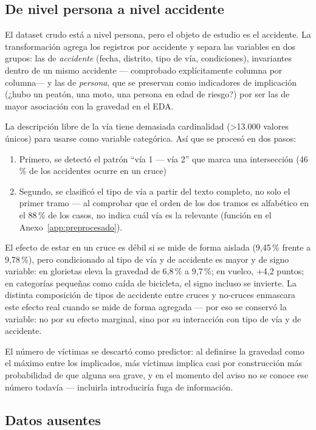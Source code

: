 \documentclass[11pt,a4paper]{article}
\begin{document}
\subsection{De nivel persona a nivel accidente}

El dataset crudo está a nivel persona, pero el objeto de estudio es el accidente. La transformación agrega los registros por accidente y separa las variables en dos grupos: las de \emph{accidente} (fecha, distrito, tipo de vía, condiciones), invariantes dentro de un mismo accidente --- comprobado explícitamente columna por columna--- y las de \emph{persona}, que se preservan como indicadores de implicación (¿hubo un peatón, una moto, una persona en edad de riesgo?) por ser las de mayor asociación con la gravedad en el EDA.

La descripción libre de la vía tiene demasiada cardinalidad (>13.000 valores únicos) para usarse como variable categórica. Así que se procesó en dos pasos: 
\begin{enumerate}[nosep]
\item Primero, se detectó el patrón ``vía 1 --- vía 2'' que marca una intersección (46\,\% de los accidentes ocurre en un cruce)
\item Segundo, se clasificó el tipo de vía a partir del texto completo, no solo el primer tramo --- al comprobar que el orden de los dos tramos es alfabético en el 88\,\% de los casos, no indica cuál vía es la relevante (función en el Anexo~\ref{app:preprocesado}).
\end{enumerate}

El efecto de estar en un cruce es débil si se mide de forma aislada (9,45\,\% frente a 9,78\,\%), pero condicionado al tipo de vía y de accidente es mayor y de signo variable: en glorietas eleva la gravedad de 6,8\,\% a 9,7\,\%; en vuelco, +4,2 puntos; en categorías pequeñas como caída de bicicleta, el signo incluso se invierte. La distinta composición de tipos de accidente entre cruces y no-cruces enmascara este efecto real cuando se mide de forma agregada --- por eso se conservó la variable: no por su efecto marginal, sino por su interacción con tipo de vía y de accidente.

El número de víctimas se descartó como predictor: al definirse la gravedad como el máximo entre los implicados, más víctimas implica casi por construcción más probabilidad de que alguna sea grave, y en el momento del aviso no se conoce ese número todavía --- incluirla introduciría fuga de información.

\subsection{Datos ausentes}
\end{document}
